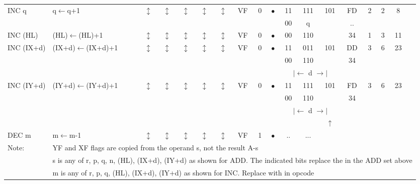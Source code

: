 \documentclass[oneside,a4paper]{book}
\begin{document}
{\begin{tabular}{llcccccccccccccccl}
		INC q\instrt & 
			q$\leftarrow$q+1 & 
			$\updownarrow$ & 
				$\updownarrow$ & 
				$\updownarrow$ & 
				$\updownarrow$ & 
				$\updownarrow$ & 
				VF & 
				0 & 
				$\bullet$ & 
			11 & 111 & 101 & 
			FD & 2 & 
			2 & 8 & \\ 
		\multicolumn{10}{c}{} & 00 & q & \fbox{100} & .. & \instrb \\

		INC (HL)\instrt & 
			(HL)$\leftarrow$(HL)+1 & 
			$\updownarrow$ & 
				$\updownarrow$ & 
				$\updownarrow$ & 
				$\updownarrow$ & 
				$\updownarrow$ & 
				VF & 
				0 & 
				$\bullet$ & 
			00 & 110 & \fbox{100} & 
			34 & 1 & 
			3 & 11 & \instrb \\

		INC (IX+d)\instrt & 
			(IX+d)$\leftarrow$(IX+d)+1 & 
			$\updownarrow$ & 
				$\updownarrow$ & 
				$\updownarrow$ & 
				$\updownarrow$ & 
				$\updownarrow$ & 
				VF & 
				0 & 
				$\bullet$ & 
			11 & 011 & 101 & 
			DD & 3 & 
			6 & 23 & \\ 
		\multicolumn{10}{c}{} & 00 & 110 & \fbox{100} & 34 & \\
		\multicolumn{10}{c}{} & \multicolumn{3}{c}{$|\longleftarrow$ d $\longrightarrow|$} & \instrb \\

		INC (IY+d)\instrt & 
			(IY+d)$\leftarrow$(IY+d)+1 & 
			$\updownarrow$ & 
				$\updownarrow$ & 
				$\updownarrow$ & 
				$\updownarrow$ & 
				$\updownarrow$ & 
				VF & 
				0 & 
				$\bullet$ & 
			11 & 111 & 101 & 
			FD & 3 & 
			6 & 23 & \\ 
		\multicolumn{10}{c}{} & 00 & 110 & \fbox{100} & 34 & \\
		\multicolumn{10}{c}{} & \multicolumn{3}{c}{$|\longleftarrow$ d $\longrightarrow|$} &  \instrb \\

	& & & & & & & & & & & & $\uparrow$ & & & & & \instrb \\

		DEC m\instrt &
			m$\leftarrow$m-1 & 
			$\updownarrow$ & 
				$\updownarrow$ & 
				$\updownarrow$ & 
				$\updownarrow$ & 
				$\updownarrow$ & 
				VF & 
				1 & 
				$\bullet$ &
			.. & ... & \fbox{101}
			& & 
			& & & \instrb \\

	\hline

		Note:

			& \multicolumn{17}{l}{\parbox{12cm}{\footnotemark[1]YF and XF flags are copied from the operand s, not the result A-s}}\notet\noteb \\

			& \multicolumn{17}{l}{\parbox{12cm}{s is any of r, p, q, n, (HL), (IX+d), (IY+d) as shown for ADD. The indicated bits replace the  in the ADD set above}}\notet\noteb \\

			& \multicolumn{17}{l}{\parbox{12cm}{m is any of r, p, q, (HL), (IX+d), (IY+d) as shown for INC. Replace  with  in opcode}}\notet\noteb \\
	
	\hline

	\end{tabular}
}
\end{document}
